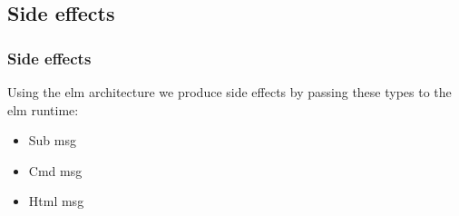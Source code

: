 \subsection{Side effects}    
    \begin{frame}
        \frametitle{Side effects}
        Using the elm architecture we produce side effects by passing 
        these types to the elm runtime:
        \begin{itemize}
            \item{Sub msg}
            \item{Cmd msg}
            \item{Html msg}
        \end{itemize}
        
    \end{frame}